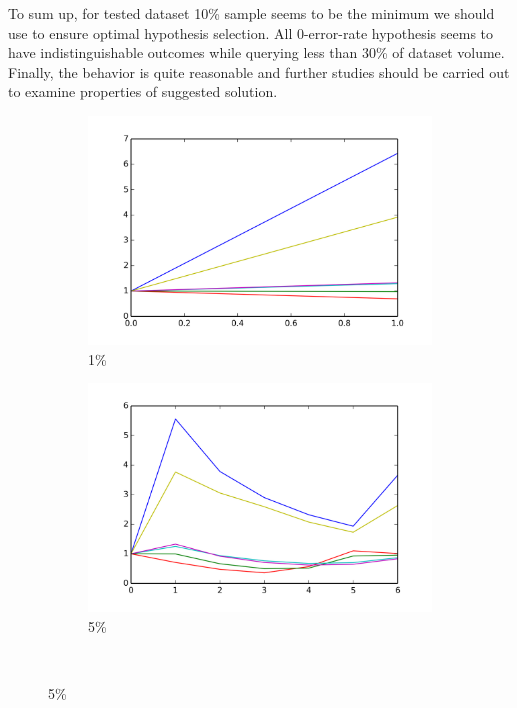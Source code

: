 \documentclass[12pt, a4paper, pdflatex, leqno]{report}
\begin{document}
To sum up, for tested dataset 10\% sample seems to be the minimum we should use to ensure optimal hypothesis selection. All 0-error-rate hypothesis seems to have indistinguishable outcomes while querying less than 30\% of dataset volume. Finally, the behavior is quite reasonable and further studies should be carried out to examine properties of suggested solution.\\

\begin{figure}[htbp]
  \begin{subfigure}{.5\linewidth}\centering
    \includegraphics[width=1.1\textwidth]{graphics/convergence01.png}
    \caption{1\%\label{fig:conv.ALL:01}}
  \end{subfigure}
  \begin{subfigure}{.5\linewidth}\centering
    \includegraphics[width=1.1\textwidth]{graphics/convergence05.png}
    \caption{5\%\label{fig:conv.ALL:05}}
  \end{subfigure}\\[1ex]


\end{figure}
\end{document}
